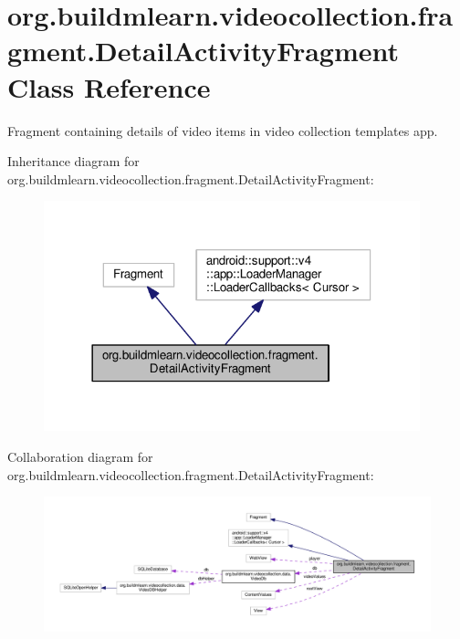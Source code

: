 \hypertarget{classorg_1_1buildmlearn_1_1videocollection_1_1fragment_1_1DetailActivityFragment}{}\section{org.\+buildmlearn.\+videocollection.\+fragment.\+Detail\+Activity\+Fragment Class Reference}
\label{classorg_1_1buildmlearn_1_1videocollection_1_1fragment_1_1DetailActivityFragment}


Fragment containing details of video items in video collection template\textquotesingle{}s app.  




Inheritance diagram for org.\+buildmlearn.\+videocollection.\+fragment.\+Detail\+Activity\+Fragment\+:
\nopagebreak
\begin{figure}[H]
\begin{center}
\leavevmode
\includegraphics[width=309pt]{classorg_1_1buildmlearn_1_1videocollection_1_1fragment_1_1DetailActivityFragment__inherit__graph}
\end{center}
\end{figure}


Collaboration diagram for org.\+buildmlearn.\+videocollection.\+fragment.\+Detail\+Activity\+Fragment\+:
\nopagebreak
\begin{figure}[H]
\begin{center}
\leavevmode
\includegraphics[width=350pt]{classorg_1_1buildmlearn_1_1videocollection_1_1fragment_1_1DetailActivityFragment__coll__graph}
\end{center}
\end{figure}
